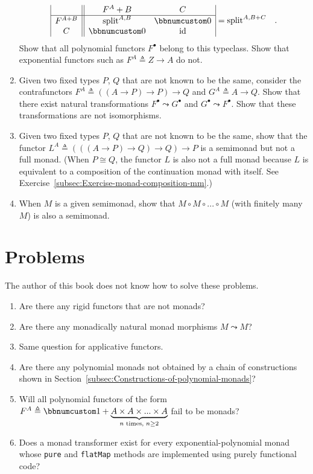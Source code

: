 \begin{enumerate}
\[\begin{array}{|c||cc|}
 & F^{A}+B & C\\
\hline F^{A+B} & \text{split}^{A,B} & \bbnum 0\\
C & \bbnum 0 & \text{id}
\end{array}=\text{split}^{A,B+C}\quad.
\]
Show that all polynomial functors $F^{\bullet}$ belong to this typeclass.
Show that exponential functors such as $F^{A}\triangleq Z\rightarrow A$
do not. 
\item Given two fixed types $P$, $Q$ that are not known to be the same,
consider the contrafunctors $F^{A}\triangleq\left(\left(A\rightarrow P\right)\rightarrow P\right)\rightarrow Q$
and $G^{A}\triangleq A\rightarrow Q$. Show that there exist natural
transformations $F^{\bullet}\leadsto G^{\bullet}$ and $G^{\bullet}\leadsto F^{\bullet}$.
Show that these transformations are not isomorphisms.
\item Given two fixed types $P$, $Q$ that are not known to be the same,
show that the functor $L^{A}\triangleq\left(\left(\left(A\rightarrow P\right)\rightarrow Q\right)\rightarrow Q\right)\rightarrow P$
is a semimonad but not a full monad. (When $P\cong Q$, the functor
$L$ is also not a full monad because $L$ is equivalent to a composition
of the continuation monad with itself. See Exercise~\ref{subsec:Exercise-monad-composition-mm}.)
\item When $M$ is a given semimonad, show that $M\circ M\circ...\circ M$
(with finitely many $M$) is also a semimonad.
\end{enumerate}

\section{Problems}

The author of this book does not know how to solve these problems.
\begin{enumerate}
\item Are there any rigid functors that are not monads?
\item Are there any monadically natural monad morphisms $M\leadsto M$?
\item Same question for applicative functors.
\item Are there any polynomial monads not obtained by a chain of constructions
shown in Section~\ref{subsec:Constructions-of-polynomial-monads}?
\item Will all polynomial functors of the form $F^{A}\triangleq\bbnum 1+\underbrace{A\times A\times...\times A}_{n\text{ times, }n\ge2}$
fail to be monads?
\item Does a monad transformer exist for every exponential-polynomial monad
whose \lstinline!pure! and \lstinline!flatMap! methods are implemented
using purely functional code?
\end{enumerate}

